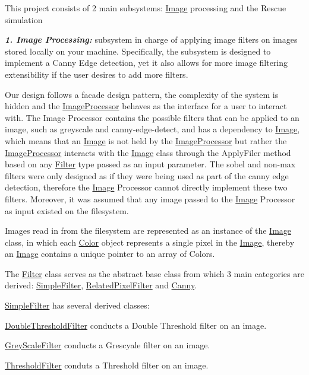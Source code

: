 This project consists of 2 main subsystems\+: \hyperlink{classImage}{Image} processing and the Rescue simulation

{\itshape {\bfseries 1. Image Processing\+:}} subsystem in charge of applying image filters on images stored locally on your machine. Specifically, the subsystem is designed to implement a Canny Edge detection, yet it also allows for more image filtering extensibility if the user desires to add more filters.

Our design follows a facade design pattern, the complexity of the system is hidden and the \hyperlink{classImageProcessor}{Image\+Processor} behaves as the interface for a user to interact with. The Image Processor contains the possible filters that can be applied to an image, such as {\ttfamily greyscale} and {\ttfamily canny-\/edge-\/detect}, and has a dependency to \hyperlink{classImage}{Image}, which means that an \hyperlink{classImage}{Image} is not held by the \hyperlink{classImageProcessor}{Image\+Processor} but rather the \hyperlink{classImageProcessor}{Image\+Processor} interacts with the \hyperlink{classImage}{Image} class through the Apply\+Filer method based on any \hyperlink{classFilter}{Filter} type passed as an input parameter. The {\ttfamily sobel} and {\ttfamily non-\/max} filters were only designed as if they were being used as part of the canny edge detection, therefore the \hyperlink{classImage}{Image} Processor cannot directly implement these two filters. Moreover, it was assumed that any image passed to the \hyperlink{classImage}{Image} Processor as input existed on the filesystem.



Images read in from the filesystem are represented as an instance of the \hyperlink{classImage}{Image} class, in which each \hyperlink{classColor}{Color} object represents a single pixel in the \hyperlink{classImage}{Image}, thereby an \hyperlink{classImage}{Image} contains a unique pointer to an array of Colors.



The \hyperlink{classFilter}{Filter} class serves as the abstract base class from which 3 main categories are derived\+: \hyperlink{classSimpleFilter}{Simple\+Filter}, \hyperlink{classRelatedPixelFilter}{Related\+Pixel\+Filter} and \hyperlink{classCanny}{Canny}.



\hyperlink{classSimpleFilter}{Simple\+Filter} has several derived classes\+:
\begin{DoxyItemize}
\item \hyperlink{classDoubleThresholdFilter}{Double\+Threshold\+Filter} conducts a Double Threshold filter on an image.
\item \hyperlink{classGreyScaleFilter}{Grey\+Scale\+Filter} conducts a Grescyale filter on an image.
\item \hyperlink{classThresholdFilter}{Threshold\+Filter} conduts a Threshold filter on an image.
\end{DoxyItemize}

